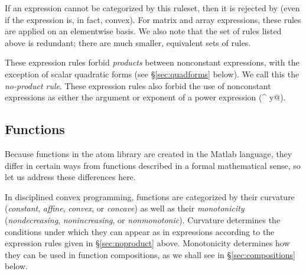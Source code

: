 \documentclass[12pt]{article}
\begin{document}
If an expression cannot be categorized by this ruleset, then it is 
rejected by \cvx (even if the expression is, in fact, convex).
For matrix and array expressions, these rules
are applied on an elementwise basis.
We also note that the set of rules listed above is redundant;
there are much smaller, equivalent sets of rules.

These expression rules forbid \emph{products}
between nonconstant expressions, 
with the exception of scalar quadratic forms 
(see \S\ref{sec:quadforms} below).
We call this the \emph{no-product rule}.
These expression rules also forbid the use of 
nonconstant expressions as either the argument or exponent of a 
power expression (\verb@x ^ y@).

\subsection{Functions}

Because functions in the \cvx atom library are created in the 
Matlab language,
they differ in certain ways from functions described in a 
formal mathematical sense,
so let us address these differences here.

In disciplined convex programming, functions are categorized by their
curvature (\emph{constant}, \emph{affine},
\emph{convex}, or \emph{concave}) as well as their
\emph{monotonicity}
(\emph{nondecreasing}, \emph{nonincreasing}, or \emph{nonmonotonic}).
Curvature determines the conditions
under which they can appear as in expressions according to the
expression rules given in \S\ref{sec:noproduct} above.
Monotonicity determines
how they can be used in function  compositions, 
as we shall see in \S\ref{sec:compositions} below.
\end{document}
